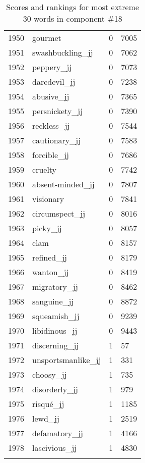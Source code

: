 \begin{longtable}[!htbp]{| rlr@{.}l |}
    1950 & gourmet & 0 & 7005 \\
    1951 & swashbuckling\_jj & 0 & 7062 \\
    1952 & peppery\_jj & 0 & 7073 \\
    1953 & daredevil\_jj & 0 & 7238 \\
    1954 & abusive\_jj & 0 & 7365 \\
    1955 & persnickety\_jj & 0 & 7390 \\
    1956 & reckless\_jj & 0 & 7544 \\
    1957 & cautionary\_jj & 0 & 7583 \\
    1958 & forcible\_jj & 0 & 7686 \\
    1959 & cruelty & 0 & 7742 \\
    1960 & absent-minded\_jj & 0 & 7807 \\
    1961 & visionary & 0 & 7841 \\
    1962 & circumspect\_jj & 0 & 8016 \\
    1963 & picky\_jj & 0 & 8057 \\
    1964 & clam & 0 & 8157 \\
    1965 & refined\_jj & 0 & 8179 \\
    1966 & wanton\_jj & 0 & 8419 \\
    1967 & migratory\_jj & 0 & 8462 \\
    1968 & sanguine\_jj & 0 & 8872 \\
    1969 & squeamish\_jj & 0 & 9239 \\
    1970 & libidinous\_jj & 0 & 9443 \\
    1971 & discerning\_jj & 1 & 57 \\
    1972 & unsportsmanlike\_jj & 1 & 331 \\
    1973 & choosy\_jj & 1 & 735 \\
    1974 & disorderly\_jj & 1 & 979 \\
    1975 & risqué\_jj & 1 & 1185 \\
    1976 & lewd\_jj & 1 & 2519 \\
    1977 & defamatory\_jj & 1 & 4166 \\
    1978 & lascivious\_jj & 1 & 4830 \\
    \hline
    \caption{Scores and rankings for most extreme 30 words in component \#18} \\
\end{longtable}

